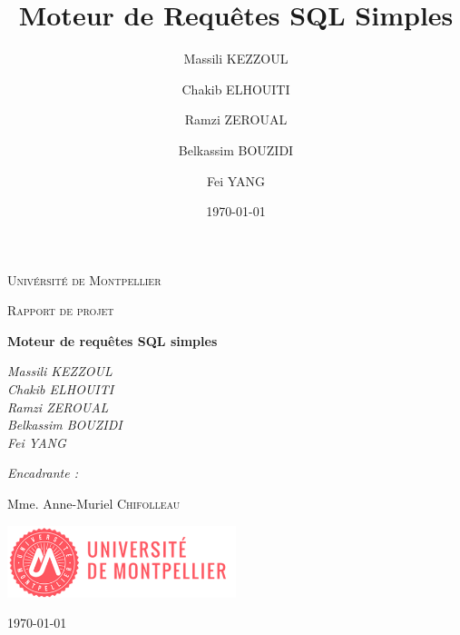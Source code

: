 \documentclass[oneside,13pt,a4paper]{report}
\title{Moteur de Requêtes SQL Simples}
\author{
    Massili KEZZOUL \and 
    Chakib ELHOUITI \and
    Ramzi ZEROUAL \and
    Belkassim BOUZIDI \and
    Fei YANG
}
\date{\today}
\begin{document}
    \begin{titlepage}
        \centering        
        {\scshape\LARGE Univérsité de Montpellier\par}
        {\scshape\Large Rapport de projet\par}
        \vspace{1.5cm}
        {\huge\bfseries Moteur de requêtes SQL simples\par}
        \vspace{2cm}
        {\Large\itshape 
            Massili KEZZOUL \\
            Chakib ELHOUITI \\
            Ramzi ZEROUAL \\
            Belkassim BOUZIDI \\
            Fei YANG \\
        \par}
        
        \vspace{1.5cm}

        {\Large\itshape 
            Encadrante :\par
            Mme. Anne-Muriel \textsc{Chifolleau}
        \par}
        
        \vspace{2cm}

        \includegraphics[width=0.5\textwidth]{img/univ-montpellier.png}\par\vspace{1cm}

        \vfill

        {\large \today\par}
    \end{titlepage}

    \tableofcontents

\parskip=5pt

\end{document}
